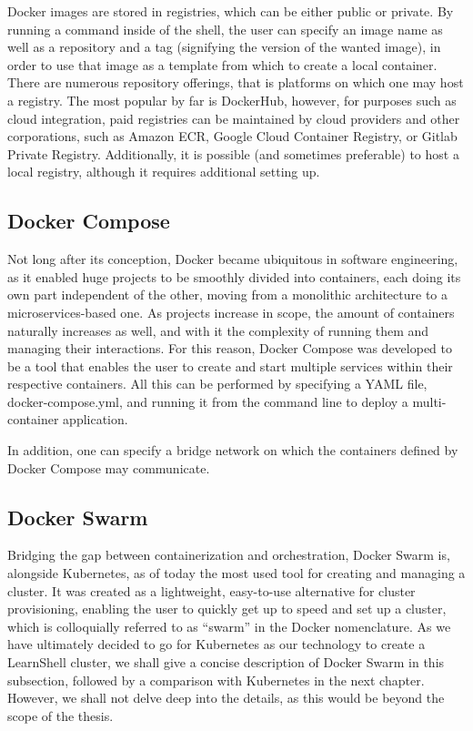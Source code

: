 \documentclass[thesis=B,english]{FITthesis}[2019/12/23]
\begin{document}
Docker images are stored in registries, which can be either public or private. By running a command inside of the shell, the user can specify an image name as well as a repository and a tag (signifying the version of the wanted image), in order to use that image as a template from which to create a local container. There are numerous repository offerings, that is platforms on which one may host a registry. The most popular by far is DockerHub, however, for purposes such as cloud integration, paid registries can be maintained by cloud providers and other corporations, such as Amazon ECR, Google Cloud Container Registry, or Gitlab Private Registry. Additionally, it is possible (and sometimes preferable) to host a local registry, although it requires additional setting up.

\subsection{Docker Compose}

Not long after its conception, Docker became ubiquitous in software engineering, as it enabled huge projects to be smoothly divided into containers, each doing its own part independent of the other, moving from a monolithic architecture to a microservices-based one. As projects increase in scope, the amount of containers naturally increases as well, and with it the complexity of running them and managing their interactions. For this reason, Docker Compose was developed to be a tool that enables the user to create and start multiple services within their respective containers. All this can be performed by specifying a YAML file, docker-compose.yml, and running it from the command line to deploy a multi-container application. \cite{docker-compose-docs}

In addition, one can specify a bridge network on which the containers defined by Docker Compose may communicate.

\subsection{Docker Swarm}

Bridging the gap between containerization and orchestration, Docker Swarm is, alongside Kubernetes, as of today the most used tool for creating and managing a cluster. It was created as a lightweight, easy-to-use alternative for cluster provisioning, enabling the user to quickly get up to speed and set up a cluster, which is colloquially referred to as “swarm” in the Docker nomenclature. As we have ultimately decided to go for Kubernetes as our technology to create a LearnShell cluster, we shall give a concise description of Docker Swarm in this subsection, followed by a comparison with Kubernetes in the next chapter. However, we shall not delve deep into the details, as this would be beyond the scope of the thesis.
\end{document}

